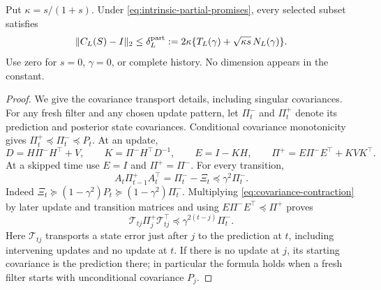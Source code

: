 \begin{theorem}
\label{thm:partial-locality}
Put $\kappa=s/(1+s)$. Under \eqref{eq:intrinsic-partial-promises},
every selected subset satisfies
\begin{equation}
 \lVert C_L(S)-I\rVert_2\le
 \delta_L^{\mathrm{part}}:=
 2\kappa\{T_L(\gamma)+\sqrt{\kappa s}\,N_L(\gamma)\}.
 \label{eq:partial-normalized-delta}
\end{equation}
Use zero for $s=0$, $\gamma=0$, or complete history. No dimension
appears in the constant.
\end{theorem}
\begin{proof}
We give the covariance transport details, including singular covariances.
For any fresh filter and any chosen update pattern, let $\Pi_t^-$ and
$\Pi_t^+$ denote its prediction and posterior state covariances.
Conditional covariance monotonicity gives
$\Pi_t^+\preceq\Pi_t^-\preceq P_t$.
At an update,
\[
 D=H\Pi^-H^\top+V,\qquad K=\Pi^-H^\top D^{-1},\qquad E=I-KH,
 \qquad \Pi^+=E\Pi^-E^\top+KVK^\top.
\]
At a skipped time use $E=I$ and $\Pi^+=\Pi^-$. For every transition,
\begin{equation}
 A_t\Pi_{t-1}^+A_t^\top=\Pi_t^- -\Xi_t
 \preceq\gamma^2\Pi_t^-.
 \label{eq:covariance-contraction}
\end{equation}
Indeed $\Xi_t\succeq(1-\gamma^2)P_t
\succeq(1-\gamma^2)\Pi_t^-$. Multiplying
\eqref{eq:covariance-contraction} by later update and transition matrices
and using $E\Pi^-E^\top\preceq\Pi^+$ proves
\begin{equation}
 \mathcal T_{tj}\Pi_j^+\mathcal T_{tj}^\top
       \preceq\gamma^{2(t-j)}\Pi_t^-.
 \label{eq:transport}
\end{equation}
Here $\mathcal T_{tj}$ transports a state error just after $j$ to the
prediction at $t$, including intervening updates and no update at $t$.
If there is no update at $j$, its starting covariance is the prediction
there; in particular the formula holds when a fresh filter starts with
unconditional covariance $P_j$.


\end{proof}
